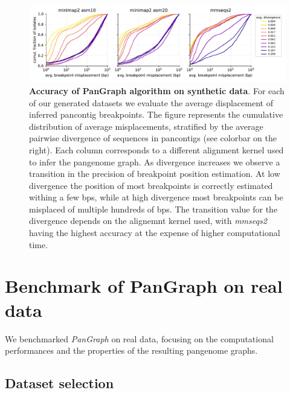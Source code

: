 \documentclass[aps,rmp,reprint,superscriptaddress,notitlepage,10pt,onecolumn]{revtex4-1}
\begin{document}
\begin{figure}[htb]
    \includegraphics[width=\textwidth]{figs_suppl/accuracy_comparison.pdf}
    \caption{{\bf Accuracy of PanGraph algorithm on synthetic data}. For each of our generated datasets we evaluate the average displacement of inferred pancontig breakpoints. The figure represents the cumulative distribution of average misplacements, stratified by the average pairwise divergence of sequences in pancontigs (see colorbar on the right). Each column corresponds to a different alignment kernel used to infer the pangenome graph. As divergence increases we observe a transition in the precision of breakpoint position estimation. At low divergence the position of most breakpoints is correctly estimated withing a few bps, while at high divergence most breakpoints can be misplaced of multiple hundreds of bps. The transition value for the divergence depends on the alignemnt kernel used, with \textit{mmseqs2} having the highest accuracy at the expense of higher computational time.}
    \label{fig:benchmark-accuracy-suppl}
\end{figure}

\section{Benchmark of PanGraph on real data}

We benchmarked \textit{PanGraph} on real data, focusing on the computational performances and the properties of the resulting pangenome graphs.

\subsection{Dataset selection}
\end{document}
